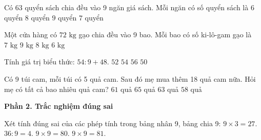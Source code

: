 \begin{ex} %
Có 63 quyển sách chia đều vào 9 ngăn giá sách. Mỗi ngăn có số quyển sách là
\choice
{$6$ quyển}
{$8$ quyển}
{$9$ quyển}
{\True $7$ quyển}
\end{ex}

\begin{ex} %
Một cửa hàng có $72\text{ kg}$ gạo chia đều vào 9 bao. Mỗi bao có số ki-lô-gam gạo là
\choice
{$7\text{ kg}$}
{$9\text{ kg}$}
{\True $8\text{ kg}$}
{$6\text{ kg}$}
\end{ex}

\begin{ex} %
Tính giá trị biểu thức: $54 : 9 + 48$.
\choice
{$52$}
{\True $54$}
{$56$}
{$50$}
\end{ex}

\begin{ex} %
Có 9 túi cam, mỗi túi có 5 quả cam. Sau đó mẹ mua thêm 18 quả cam nữa. Hỏi mẹ có tất cả bao nhiêu quả cam?
\choice
{$61$ quả}
{$65$ quả}
{\True $63$ quả}
{$58$ quả}
\end{ex}

\textbf{Phần 2. Trắc nghiệm đúng sai}

\begin{ex} %
Xét tính đúng sai của các phép tính trong bảng nhân 9, bảng chia 9:
\choiceTF
{\True $9 \times 3 = 27$.}
{\True $36 : 9 = 4$.}
{$9 \times 9 = 80$.}
{\True $9 \times 9 = 81$.}
\end{ex}

